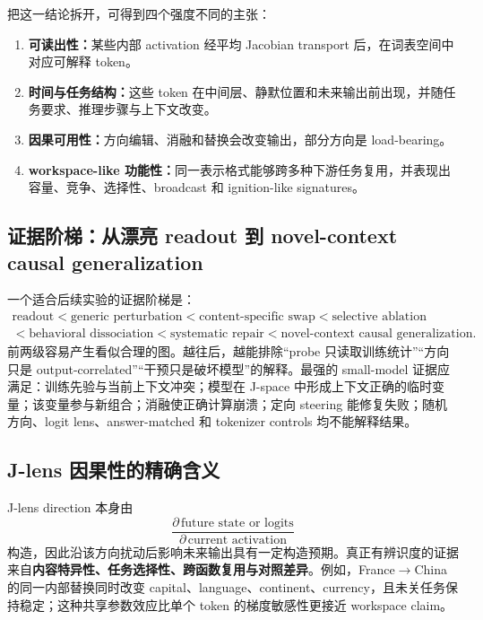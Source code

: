 \documentclass[10.5pt,a4paper]{ctexart}
\begin{document}
把这一结论拆开，可得到四个强度不同的主张：
\begin{enumerate}
  \item \textbf{可读出性：}某些内部 activation 经平均 Jacobian transport 后，在词表空间中对应可解释 token。
  \item \textbf{时间与任务结构：}这些 token 在中间层、静默位置和未来输出前出现，并随任务要求、推理步骤与上下文改变。
  \item \textbf{因果可用性：}方向编辑、消融和替换会改变输出，部分方向是 load-bearing。
  \item \textbf{workspace-like 功能性：}同一表示格式能够跨多种下游任务复用，并表现出容量、竞争、选择性、broadcast 和 ignition-like signatures。
\end{enumerate}

\subsection{证据阶梯：从漂亮 readout 到 novel-context causal generalization}
一个适合后续实验的证据阶梯是：
\[
\begin{gathered}
\text{readout}<\text{generic perturbation}<\text{content-specific swap}<\text{selective ablation}\\
<\text{behavioral dissociation}<\text{systematic repair}<\text{novel-context causal generalization}.
\end{gathered}
\]
前两级容易产生看似合理的图。越往后，越能排除“probe 只读取训练统计”“方向只是 output-correlated”“干预只是破坏模型”的解释。最强的 small-model 证据应满足：训练先验与当前上下文冲突；模型在 J-space 中形成上下文正确的临时变量；该变量参与新组合；消融使正确计算崩溃；定向 steering 能修复失败；随机方向、logit lens、answer-matched 和 tokenizer controls 均不能解释结果。

\subsection{J-lens 因果性的精确含义}
J-lens direction 本身由
\[
\frac{\partial\,\text{future state or logits}}{\partial\,\text{current activation}}
\]
构造，因此沿该方向扰动后影响未来输出具有一定构造预期。真正有辨识度的证据来自\textbf{内容特异性、任务选择性、跨函数复用与对照差异}。例如，France$\rightarrow$China 的同一内部替换同时改变 capital、language、continent、currency，且未关任务保持稳定；这种共享参数效应比单个 token 的梯度敏感性更接近 workspace claim。
\end{document}
